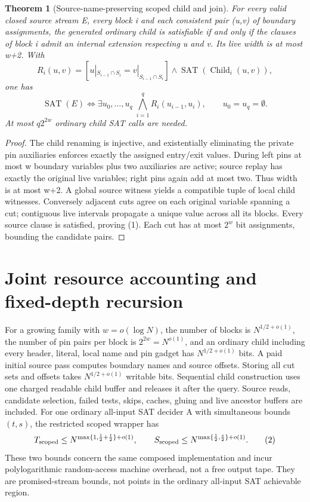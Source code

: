 \documentclass[11pt]{article}
\newtheorem{theorem}{Theorem}
\begin{document}
\begin{theorem}[Source-name-preserving scoped child and join]
For every valid closed source stream E, every block i and each consistent pair (u,v) of boundary assignments, the generated ordinary child is satisfiable if and only if the clauses of block i admit an internal extension respecting u and v. Its live width is at most w+2. With
\[
 R_i(u,v)=[u|_{S_{i-1}\cap S_i}=v|_{S_{i-1}\cap S_i}]
          \land \operatorname{SAT}(\operatorname{Child}_i(u,v)),
\]
one has
\[
 \operatorname{SAT}(E)
 \iff \exists u_0,\ldots,u_q\;
          \bigwedge_{i=1}^q R_i(u_{i-1},u_i),
 \qquad u_0=u_q=\emptyset.
\tag{1}
\]
At most \(q2^{2w}\) ordinary child SAT calls are needed.
\end{theorem}
\begin{proof}
The child renaming is injective, and existentially eliminating the private pin auxiliaries enforces exactly the assigned entry/exit values. During left pins at most w boundary variables plus two auxiliaries are active; source replay has exactly the original live variables; right pins again add at most two. Thus width is at most w+2. A global source witness yields a compatible tuple of local child witnesses. Conversely adjacent cuts agree on each original variable spanning a cut; contiguous live intervals propagate a unique value across all its blocks. Every source clause is satisfied, proving (1). Each cut has at most \(2^w\) bit assignments, bounding the candidate pairs.
\end{proof}

\section{Joint resource accounting and fixed-depth recursion}
For a growing family with \(w=o(\log N)\), the number of blocks is \(N^{1/2+o(1)}\), the number of pin pairs per block is \(2^{2w}=N^{o(1)}\), and an ordinary child including every header, literal, local name and pin gadget has \(N^{1/2+o(1)}\) bits. A paid initial source pass computes boundary names and source offsets. Storing all cut sets and offsets takes \(N^{1/2+o(1)}\) writable bits. Sequential child construction uses one charged readable child buffer and releases it after the query. Source reads, candidate selection, failed tests, skips, caches, gluing and live ancestor buffers are included. For one ordinary all-input SAT decider A with simultaneous bounds \((t,s)\), the restricted scoped wrapper has
\[
 T_{\rm scoped}\le N^{\max\{1,\frac12+\frac t2\}+o(1)},\qquad
 S_{\rm scoped}\le N^{\max\{\frac12,\frac s2\}+o(1)}.
\tag{2}
\]
These two bounds concern the same composed implementation and incur polylogarithmic random-access machine overhead, not a free output tape. They are promised-stream bounds, not points in the ordinary all-input SAT achievable region.
\end{document}
